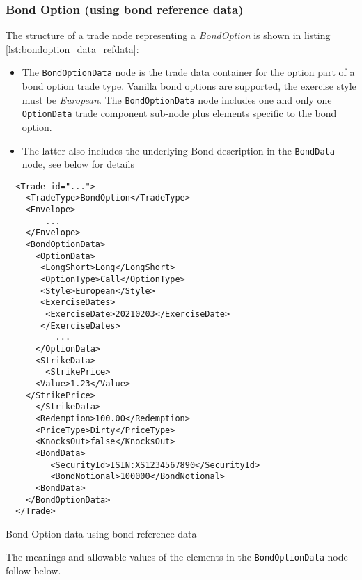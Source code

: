 \subsubsection{Bond Option (using bond reference data)}
\label{ss:bondoption_refdata}

The structure of a trade node representing a \emph{BondOption}  is shown in
listing \ref{lst:bondoption_data_refdata}:
\begin{itemize}
\item The \lstinline!BondOptionData!  node is the trade data container for
the option part of a bond option trade type. Vanilla bond
options are supported, the exercise style must be \emph{European}.
The \lstinline!BondOptionData!  node includes one and
only one \lstinline!OptionData! trade component sub-node plus elements
specific to the bond option.
\item The latter also includes the underlying Bond description in the \lstinline!BondData!
  node, see below for details
\end{itemize}

\begin{listing}[H]
\begin{verbatim}
  <Trade id="...">
    <TradeType>BondOption</TradeType>
    <Envelope>
        ...
    </Envelope>
    <BondOptionData>
      <OptionData>
       <LongShort>Long</LongShort>
       <OptionType>Call</OptionType>
       <Style>European</Style>
       <ExerciseDates>
        <ExerciseDate>20210203</ExerciseDate>
       </ExerciseDates>
          ...
      </OptionData>
      <StrikeData>
        <StrikePrice>
	  <Value>1.23</Value>
	</StrikePrice>
      </StrikeData>
      <Redemption>100.00</Redemption>
      <PriceType>Dirty</PriceType>
      <KnocksOut>false</KnocksOut>
      <BondData>
         <SecurityId>ISIN:XS1234567890</SecurityId>
         <BondNotional>100000</BondNotional>
      <BondData>
    </BondOptionData>
  </Trade>
\end{verbatim}
\caption{Bond Option data using bond reference data}
\label{lst:bondoption_data_refdata}
\end{listing}

The meanings and allowable values of the elements in the \lstinline!BondOptionData!  node follow below.

